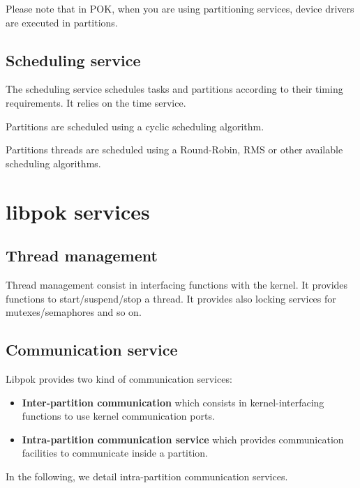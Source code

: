       Please note that in POK, when you are using partitioning services, device
      drivers are executed in partitions.

   \subsection{Scheduling service}
   The scheduling service schedules tasks and partitions according to their
   timing requirements. It relies on the time service.

   Partitions are scheduled using a cyclic scheduling algorithm.

   Partitions threads are scheduled using a Round-Robin, RMS or other available
   scheduling algorithms.


\section{libpok services}
   \subsection{Thread management}
   Thread management consist in interfacing functions with the kernel. It
   provides functions to start/suspend/stop a thread. It provides also locking
   services for mutexes/semaphores and so on.

   \subsection{Communication service}
   Libpok provides two kind of communication services:
   \begin{itemize}
      \item
         \textbf{Inter-partition communication} which consists in
         kernel-interfacing functions to use kernel communication ports.
      \item
         \textbf{Intra-partition communication service} which provides
         communication facilities to communicate inside a partition.
   \end{itemize}

   In the following, we detail intra-partition communication services.


